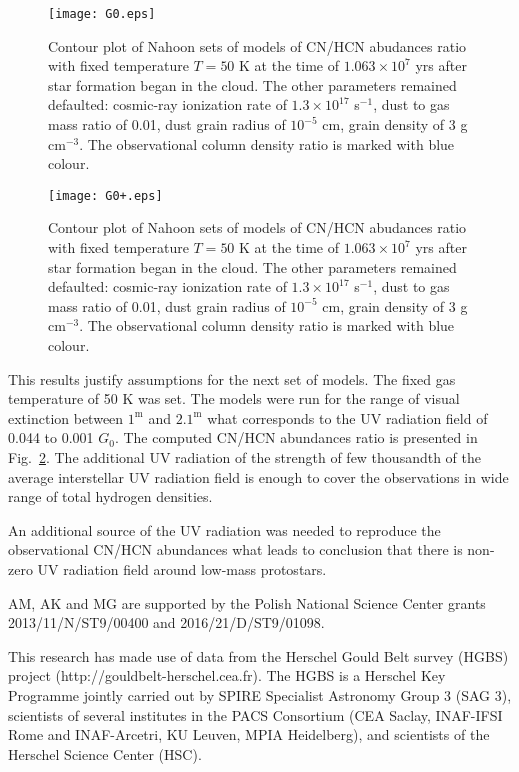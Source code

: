 \documentclass{aa}
\begin{document}
\begin{figure}
   \centering
   \texttt{[image: G0.eps]}
      \caption{Contour plot of Nahoon sets of models of CN/HCN abudances ratio with fixed temperature $T = 50$ K at the time of $1.063\times 10^{7}$ yrs after star formation began in the cloud. The other parameters remained defaulted: cosmic-ray ionization rate of $1.3\times 10^{17}$ s$^{-1}$, dust to gas mass ratio of 0.01, dust grain radius of $10^{-5}$ cm, grain density of 3 g cm$^{-3}$. The observational column density ratio is marked with blue colour.}
         \label{G0}
   \end{figure}

\begin{figure}
   \centering
   \texttt{[image: G0+.eps]}
      \caption{Contour plot of Nahoon sets of models of CN/HCN abudances ratio with fixed temperature $T = 50$ K at the time of $1.063\times 10^{7}$ yrs after star formation began in the cloud. The other parameters remained defaulted: cosmic-ray ionization rate of $1.3\times 10^{17}$ s$^{-1}$, dust to gas mass ratio of 0.01, dust grain radius of $10^{-5}$ cm, grain density of 3 g cm$^{-3}$. The observational column density ratio is marked with blue colour.}
         \label{G0}
   \end{figure}

This results justify assumptions for the next set of models. The fixed gas temperature of 50 K was set. The models were run for the range of visual extinction between $1^{\mathrm{m}}$ and $2.1^{\mathrm{m}}$ what corresponds to the UV radiation field of 0.044 to 0.001 $G_0$. The computed CN/HCN abundances ratio is presented in Fig.~\ref{G0}. The additional UV radiation of the strength of few thousandth of the average interstellar UV radiation field is enough to cover the observations in wide range of total hydrogen densities. 

An additional source of the UV radiation was needed to reproduce the observational CN/HCN abundances what leads to conclusion that there is non-zero UV radiation field around low-mass protostars. 

\begin{acknowledgements}
AM, AK and MG are supported by the Polish National Science Center grants 2013/11/N/ST9/00400 and 2016/21/D/ST9/01098. 

This research has made use of data from the Herschel Gould Belt survey (HGBS) project (http://gouldbelt-herschel.cea.fr). The HGBS is a Herschel Key Programme jointly carried out by SPIRE Specialist Astronomy Group 3 (SAG 3), scientists of several institutes in the PACS Consortium (CEA Saclay, INAF-IFSI Rome and INAF-Arcetri, KU Leuven, MPIA Heidelberg), and scientists of the Herschel Science Center (HSC).
\end{acknowledgements}
\end{document}
